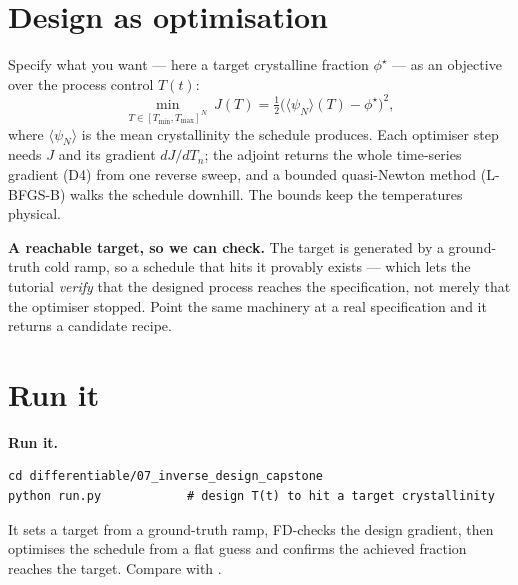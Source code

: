 \section{Design as optimisation}

Specify what you want --- here a target crystalline fraction
$\phi^\star$ --- as an objective over the process control $T(t)$:
%
\begin{equation}
  \min_{T\in[T_{\min},T_{\max}]^N}\ J(T) = \tfrac12\big(\langle\psi_N
  \rangle(T) - \phi^\star\big)^2 ,
  \label{eq:d7}
\end{equation}
%
where $\langle\psi_N\rangle$ is the mean crystallinity the schedule
produces. Each optimiser step needs $J$ and its gradient $dJ/dT_n$; the
adjoint returns the whole time-series gradient (D4) from one reverse
sweep, and a bounded quasi-Newton method (L-BFGS-B) walks the schedule
downhill. The bounds keep the temperatures physical.

\begin{keybox}
\textbf{A reachable target, so we can check.} The target is generated by a
ground-truth cold ramp, so a schedule that hits it provably exists ---
which lets the tutorial \emph{verify} that the designed process reaches
the specification, not merely that the optimiser stopped. Point the same
machinery at a real specification and it returns a candidate recipe.
\end{keybox}

\section{Run it}

\begin{runbox}
\textbf{Run it.}
\begin{lstlisting}
cd differentiable/07_inverse_design_capstone
python run.py            # design T(t) to hit a target crystallinity
\end{lstlisting}
It sets a target from a ground-truth ramp, FD-checks the design gradient,
then optimises the schedule from a flat guess and confirms the achieved
fraction reaches the target. Compare with .
\end{runbox}

